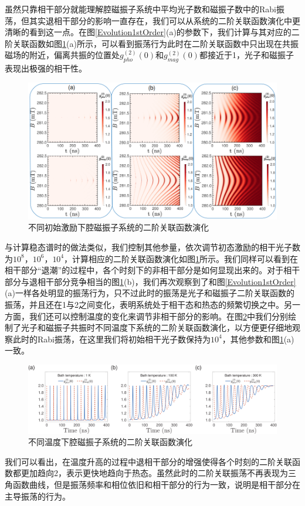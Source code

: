 虽然只靠相干部分就能理解腔磁振子系统中平均光子数和磁振子数中的Rabi振荡，但其实退相干部分的影响一直存在，我们可以从系统的二阶关联函数演化中更清晰的看到这一点。在图\ref{Evolution1stOrder}(a)的参数下，我们计算与其对应的二阶关联函数如图\ref{Evolution2edOrder}(a)所示，可以看到振荡行为此时在二阶关联函数中只出现在共振磁场的附近，偏离共振的位置处$g_{pho}^{(2)}(0)$和$g_{mag}^{(2)}(0)$都接近于1，光子和磁振子表现出极强的相干性。
\begin{figure}[htbp]
	\centering
	\includegraphics[width=3\basefigurewidth,clip]{./figure/5_3}
	\caption{不同初始激励下腔磁振子系统的二阶关联函数演化} 
	\label{Evolution2edOrder}
\end{figure}
与计算稳态谱时的做法类似，我们控制其他参量，依次调节初态激励的相干光子数为$10^8$，$10^6$，$10^4$，计算相应的二阶关联函数演化如图\ref{Evolution2edOrder}所示。我们同样可以看到在相干部分“退潮”的过程中，各个时刻下的非相干部分是如何显现出来的。对于相干部分与退相干部分竞争相当的图\ref{Evolution2edOrder}(b)，我们再次观察到了和图\ref{Evolution1stOrder}(a)一样各处明显的振荡行为，只不过此时的振荡是光子和磁振子二阶关联函数的振荡，并且还在1与2之间变化，表明系统处于相干态和热态的频繁切换之中。另一方面，我们还可以控制温度的变化来调节非相干部分的影响。在图\ref{Evolution2edOrderTVary}中我们分别绘制了光子和磁振子共振时不同温度下系统的二阶关联函数演化，以方便更仔细地观察此时的Rabi振荡，在这里我们将初始相干光子数保持为$10^4$，其他参数和图\ref{Evolution2edOrder}(a)一致。
\begin{figure}[htbp]
	\centering
	\includegraphics[width=3\basefigurewidth]{./figure/5_4}
	\caption{不同温度下腔磁振子系统的二阶关联函数演化} 
	\label{Evolution2edOrderTVary}
\end{figure}
我们可以看出，在温度升高的过程中退相干部分的增强使得各个时刻的二阶关联函数都更加趋向2，表示更快地趋向于热态。虽然此时的二阶关联振荡不再表现为三角函数曲线，但是振荡频率和相位依旧和相干部分的行为一致，说明是相干部分在主导振荡的行为。

